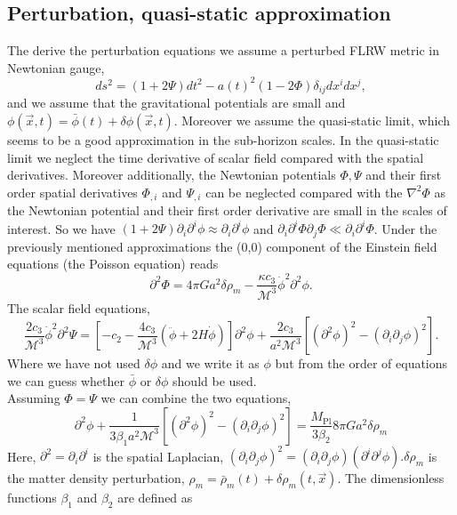 \documentclass{article}
\def\be{\begin{equation}}
\def\ee{\end{equation}}
\begin{document}
\subsection{Perturbation, quasi-static approximation}
The derive the perturbation equations we assume a perturbed FLRW metric in Newtonian gauge,
\be
d s^{2}=(1+2 \Psi) d t^{2}-a(t)^{2}(1-2 \Phi) \delta_{i j} d x^{i} d x^{j},
\ee
and we assume that the gravitational potentials are small and $\phi(\vec x, t) = \bar{\phi}(t) + \delta \phi(\vec x, t)$. Moreover we assume the quasi-static limit, which seems to be a good approximation in the sub-horizon scales. In the quasi-static limit we neglect the time derivative of scalar field compared with the spatial derivatives. Moreover additionally, the Newtonian potentials $\Phi, \Psi$ and their first order spatial derivatives $\Phi_{,i}$ and $\Psi_{,i}$ can be neglected compared with the $\nabla^2 \Phi$ as the Newtonian potential and their first order derivative are small in the scales of interest. So we have $(1+ 2 \Psi) \partial_i \partial^i \phi \approx \partial_i \partial^i \phi$ and \(\partial_{i} \partial^{i} \Phi \partial_{j} \Phi \ll \partial_{i} \partial^{i} \Phi\). Under the previously mentioned approximations the (0,0) component of the Einstein field equations (the Poisson equation) reads
\be
\partial^2 \Phi=4 \pi G a^2 \delta \rho_m-\frac{\kappa c_3}{\mathcal{M}^3} \dot{\phi}^2 \partial^2 \phi.
\ee
The scalar field equations,
\be
\frac{2 c_3}{\mathcal{M}^3} \dot{\phi}^2 \partial^2 \Psi=\left[-c_2-\frac{4 c_3}{\mathcal{M}^3}(\ddot{\phi}+2 H \dot{\phi})\right] \partial^2 \phi
+\frac{2 c_3}{a^2 \mathcal{M}^3}\left[\left(\partial^2 \phi\right)^2-\left(\partial_i \partial_j \phi\right)^2\right] .
\ee
Where we have not used $\delta \phi$ and we write it as $\phi$ but from the order of equations we can guess whether $\bar \phi$ or $\delta \phi$ should be used. \\
Assuming $\Phi = \Psi$ we can combine the two equations,
\be
\partial^{2} \phi+\frac{1}{3 \beta_{1} a^{2} \mathcal{M}^{3}}\left[\left(\partial^{2} \phi\right)^{2}-\left(\partial_{i} \partial_{j} \phi\right)^{2}\right]
=\frac{M_{\mathrm{Pl}}}{3 \beta_{2}} 8 \pi G a^{2} \delta \rho_{m}
\ee
Here, \(\partial^{2}=\partial_{i} \partial^{i}\) is the spatial Laplacian, \(\left(\partial_{i} \partial_{j} \phi\right)^{2}=\left(\partial_{i} \partial_{j} \phi\right)\left(\partial^{i} \partial^{j} \phi\right) . \delta \rho_{m}\) is the matter density perturbation, \(\rho_{m}=\bar{\rho}_{m}(t)+\delta \rho_{m}(t, \vec{x})\). The dimensionless functions \(\beta_{1}\) and \(\beta_{2}\) are defined as
\end{document}

